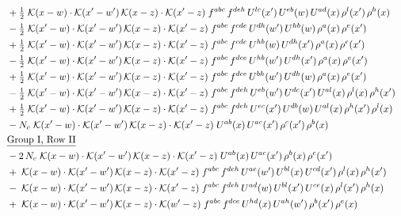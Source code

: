 \documentclass[9pt]{article}
\begin{document}
\begin{align}
&\quad +\tfrac{1}{2}\;\mathcal{K}(x-w)\cdot\mathcal{K}(x'-w')\,\mathcal{K}(x-z)\cdot\mathcal{K}(x'-z)\;f^{abc}\,f^{deh}\,U^{lc}(x')\,U^{eb}(w)\,U^{ad}(x)\,\rho^{l}(x')\,\rho^{h}(x)\notag\\
&\quad -\tfrac{1}{2}\;\mathcal{K}(x'-w)\cdot\mathcal{K}(x'-w')\,\mathcal{K}(x-z)\cdot\mathcal{K}(x'-z)\;f^{abc}\,f^{cde}\,U^{dh}(w')\,U^{hb}(w)\,\rho^{a}(x)\,\rho^{e}(x')\notag\\
&\quad +\tfrac{1}{2}\;\mathcal{K}(x'-w)\cdot\mathcal{K}(x'-w')\,\mathcal{K}(x-z)\cdot\mathcal{K}(x'-z)\;f^{abc}\,f^{cde}\,U^{hb}(w)\,U^{dh}(x')\,\rho^{a}(x)\,\rho^{e}(x')\notag\\
&\quad -\tfrac{1}{2}\;\mathcal{K}(x'-w)\cdot\mathcal{K}(x'-w')\,\mathcal{K}(x-z)\cdot\mathcal{K}(x'-z)\;f^{abc}\,f^{dce}\,U^{hb}(w')\,U^{dh}(x')\,\rho^{a}(x)\,\rho^{e}(x')\notag\\
&\quad +\tfrac{1}{2}\;\mathcal{K}(x'-w)\cdot\mathcal{K}(x'-w')\,\mathcal{K}(x-z)\cdot\mathcal{K}(x'-z)\;f^{abc}\,f^{dce}\,U^{bh}(w')\,U^{dh}(w)\,\rho^{a}(x)\,\rho^{e}(x')\notag\\
&\quad -\tfrac{1}{2}\;\mathcal{K}(x'-w)\cdot\mathcal{K}(x'-w')\,\mathcal{K}(x-z)\cdot\mathcal{K}(x'-z)\;f^{abc}\,f^{deh}\,U^{eb}(w')\,U^{dc}(x')\,U^{al}(x)\,\rho^{l}(x)\,\rho^{h}(x')\notag\\
&\quad +\tfrac{1}{2}\;\mathcal{K}(x'-w)\cdot\mathcal{K}(x'-w')\,\mathcal{K}(x-z)\cdot\mathcal{K}(x'-z)\;f^{abc}\,f^{deh}\,U^{ec}(x')\,U^{db}(w)\,U^{al}(x)\,\rho^{h}(x')\,\rho^{l}(x)\notag\\
&\quad -N_c\;\mathcal{K}(x'-w)\cdot\mathcal{K}(x'-w')\,\mathcal{K}(x-z)\cdot\mathcal{K}(x'-z)\;U^{ab}(x)\,U^{ac}(x')\,\rho^{c}(x')\,\rho^{b}(x)\notag\\
&\quad\underline{\text{Group I, Row II}}\notag\\
&\quad -2\,N_c\;\mathcal{K}(x-w)\cdot\mathcal{K}(x'-w')\,\mathcal{K}(x-z)\cdot\mathcal{K}(x'-z)\;U^{ab}(x)\,U^{ac}(x')\,\rho^{b}(x)\,\rho^{c}(x')\notag\\
&\quad +\;\mathcal{K}(x-w)\cdot\mathcal{K}(x'-w')\,\mathcal{K}(x-z)\cdot\mathcal{K}(x'-z)\;f^{abc}\,f^{deh}\,U^{ae}(w')\,U^{bl}(x)\,U^{cd}(x')\,\rho^{l}(x)\,\rho^{h}(x')\notag\\
&\quad -\;\mathcal{K}(x-w)\cdot\mathcal{K}(x'-w')\,\mathcal{K}(x-z)\cdot\mathcal{K}(x'-z)\;f^{abc}\,f^{deh}\,U^{ad}(w)\,U^{bl}(x')\,U^{ce}(x)\,\rho^{l}(x')\,\rho^{h}(x)\notag\\
&\quad +\;\mathcal{K}(x-w)\cdot\mathcal{K}(x'-w')\,\mathcal{K}(x-z)\cdot\mathcal{K}(w'-z)\;f^{abc}\,f^{dce}\,U^{hd}(x)\,U^{ah}(w')\,\rho^{b}(x')\,\rho^{e}(x)\notag\\

\end{align}
\end{document}
